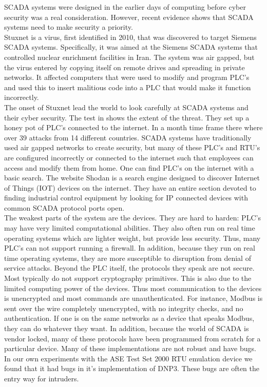 \documentclass[11pt,a4paper,oldfontcommands]{memoir}
\begin{document}
\indent \indent SCADA systems were designed in the earlier days of computing before cyber security was
a real consideration. However, recent evidence shows that SCADA systems need to make
security a priority.\\

Stuxnet is a virus, first identified in 2010, that was discovered to
target Siemens SCADA systems. Specifically, it was aimed at the
Siemens SCADA systems that controlled nuclear enrichment facilities in Iran.
The system was air gapped, but the virus entered by copying itself on
remote drives and spreading in private networks. It affected computers that
were used to modify and program PLC's and used this to insert malitious code
into a PLC that would make it function incorrectly. \\

The onset of Stuxnet lead the world to look carefully at SCADA systems and
their cyber security. The test in \cite{Who is attacking your SCADA Equipment} shows
the extent of the threat. They set up a honey pot of PLC's connected to the internet.
In a month time frame there where over 39 attacks from 14 different countries. 
SCADA systems have traditionally used air gapped networks to create security, but
many of these PLC's and RTU's are configured incorrectly or connected to the
internet such that employees can access and modify them from home. One can
find PLC's on the internet with a basic search. The website Shodan is a 
search engine designed to discover Internet of Things (IOT) devices on the internet.
They have an entire section devoted to finding industrial control equipment by looking for
IP connected devices with common SCADA protocol ports open. \cite{Shodan} \\

The weakest parts of the system are the devices. They are hard to harden:
PLC's may have very limited computational abilities. They also often run on
real time operating systems which are lighter weight, but provide less security. Thus, many
PLC's can not support running a firewall. \cite{Security Issues in SCADA Networks} In
addition, because they run on real time operating systems, they are more susceptible
to disruption from denial of service attacks.
Beyond the PLC itself, the protocols they
speak are not secure. Most typically do not support cryptography primitives.
This is also due to the limited computing power of the devices. Thus most 
communication to the devices is unencrypted and most commands are unauthenticated. For
instance, Modbus is sent over the wire completely unencrypted, with no integrity checks,
and no authentication. If one is on the same networks as a device that speaks Modbus,
they can do whatever they want. \cite{Secure Modbus} In addition, because the
world of SCADA is vendor locked, many of these protocols have been
programmed from scratch for a particular device. Many of these implementations
are not robust and have bugs. In our own experiments with the ASE Test Set 2000
RTU emulation device we found that it had bugs in it's implementation of DNP3. These
bugs are often the entry way for intruders. \\
\end{document}
